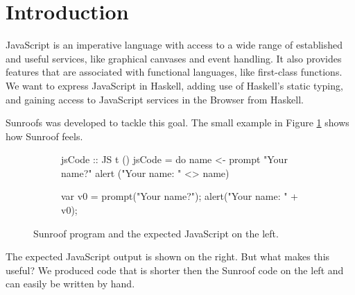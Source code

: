  
\section{Introduction}

JavaScript is an imperative language with access to a wide range
of established and useful services, like graphical canvases and event
handling. It also provides features that are associated with 
functional languages, like first-class functions. 
We want to express JavaScript in Haskell, adding use
of Haskell's static typing, and gaining access to JavaScript services
in the Browser from Haskell.

Sunroofs was developed to tackle this goal.
The small example in Figure \ref{fig:code-example} 
shows how Sunroof feels.
\begin{figure}[h]
\vspace{-0.5cm}
\centering
\begin{subfigure}{0.45\textwidth}%
\begin{Code}
 jsCode :: JS t ()
 jsCode = do
   name <- prompt "Your name?"
   alert ("Your name: " <> name)
\end{Code}%
\end{subfigure}%
\hfill%
\begin{subfigure}{0.45\textwidth}
\vspace{0.25cm}%
\begin{Code}
  
  
var v0 = prompt("Your name?"); 
alert("Your name: " + v0);
\end{Code}%
\end{subfigure}%
\caption{Sunroof program and the expected JavaScript on the left.}%
\label{fig:code-example}%
\vspace{-0.5cm}
\end{figure}
The expected JavaScript output is shown on the right. But what makes 
this useful? We produced code that is shorter 
then the Sunroof code on the left and can easily be written by hand.

